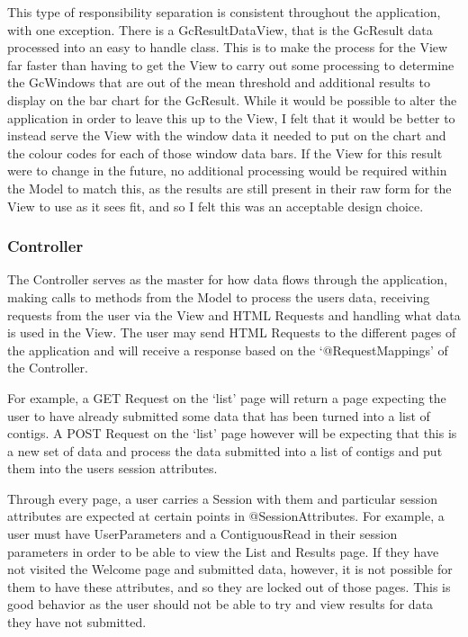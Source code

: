 This type of responsibility separation is consistent throughout the application, with one exception. There is a GcResultDataView, that is the GcResult data processed into an easy to handle class. This is to make the process for the View far faster than having to get the View to carry out some processing to determine the GcWindows that are out of the mean threshold and additional results to display on the bar chart for the GcResult. While it would be possible to alter the application in order to leave this up to the View, I felt that it would be better to instead serve the View with the window data it needed to put on the chart and the colour codes for each of those window data bars. If the View for this result were to change in the future, no additional processing would be required within the Model to match this, as the results are still present in their raw form for the View to use as it sees fit, and so I felt this was an acceptable design choice.

\subsubsection{Controller}
The Controller serves as the master for how data flows through the application, making calls to methods from the Model to process the users data, receiving requests from the user via the View and HTML Requests and handling what data is used in the View. The user may send HTML Requests to the different pages of the application and will receive a response based on the `@RequestMappings' of the Controller. 

For example, a GET Request on the `list' page will return a page expecting the user to have already submitted some data that has been turned into a list of contigs. A POST Request on the `list' page however will be expecting that this is a new set of data and process the data submitted into a list of contigs and put them into the users session attributes.

Through every page, a user carries a Session with them and particular session attributes are expected at certain points in @SessionAttributes. For example, a user must have UserParameters and a ContiguousRead in their session parameters in order to be able to view the List and Results page. If they have not visited the Welcome page and submitted data, however, it is not possible for them to have these attributes, and so they are locked out of those pages. This is good behavior as the user should not be able to try and view results for data they have not submitted.

